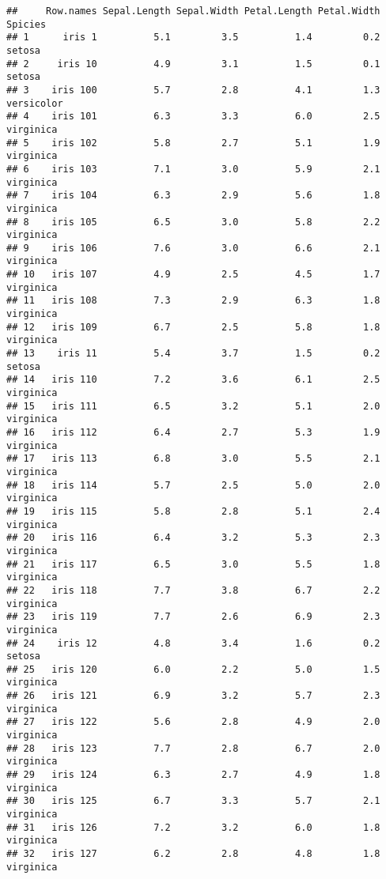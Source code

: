 \documentclass[
]{article}
\begin{document}
\begin{verbatim}
##     Row.names Sepal.Length Sepal.Width Petal.Length Petal.Width    Spicies
## 1      iris 1          5.1         3.5          1.4         0.2     setosa
## 2     iris 10          4.9         3.1          1.5         0.1     setosa
## 3    iris 100          5.7         2.8          4.1         1.3 versicolor
## 4    iris 101          6.3         3.3          6.0         2.5  virginica
## 5    iris 102          5.8         2.7          5.1         1.9  virginica
## 6    iris 103          7.1         3.0          5.9         2.1  virginica
## 7    iris 104          6.3         2.9          5.6         1.8  virginica
## 8    iris 105          6.5         3.0          5.8         2.2  virginica
## 9    iris 106          7.6         3.0          6.6         2.1  virginica
## 10   iris 107          4.9         2.5          4.5         1.7  virginica
## 11   iris 108          7.3         2.9          6.3         1.8  virginica
## 12   iris 109          6.7         2.5          5.8         1.8  virginica
## 13    iris 11          5.4         3.7          1.5         0.2     setosa
## 14   iris 110          7.2         3.6          6.1         2.5  virginica
## 15   iris 111          6.5         3.2          5.1         2.0  virginica
## 16   iris 112          6.4         2.7          5.3         1.9  virginica
## 17   iris 113          6.8         3.0          5.5         2.1  virginica
## 18   iris 114          5.7         2.5          5.0         2.0  virginica
## 19   iris 115          5.8         2.8          5.1         2.4  virginica
## 20   iris 116          6.4         3.2          5.3         2.3  virginica
## 21   iris 117          6.5         3.0          5.5         1.8  virginica
## 22   iris 118          7.7         3.8          6.7         2.2  virginica
## 23   iris 119          7.7         2.6          6.9         2.3  virginica
## 24    iris 12          4.8         3.4          1.6         0.2     setosa
## 25   iris 120          6.0         2.2          5.0         1.5  virginica
## 26   iris 121          6.9         3.2          5.7         2.3  virginica
## 27   iris 122          5.6         2.8          4.9         2.0  virginica
## 28   iris 123          7.7         2.8          6.7         2.0  virginica
## 29   iris 124          6.3         2.7          4.9         1.8  virginica
## 30   iris 125          6.7         3.3          5.7         2.1  virginica
## 31   iris 126          7.2         3.2          6.0         1.8  virginica
## 32   iris 127          6.2         2.8          4.8         1.8  virginica

\end{verbatim}
\end{document}
